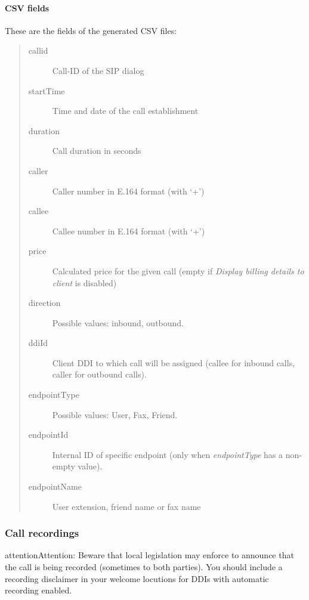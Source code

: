 \documentclass[letterpaper,10pt,english]{sphinxmanual}
\begin{document}
\paragraph{CSV fields}
\label{administration_portal/client/vpbx/calls/call_csv_schedulers:csv-fields}
These are the fields of the generated CSV files:
\begin{quote}
\begin{description}
\item[{callid}] \leavevmode
Call-ID of the SIP dialog

\item[{startTime}] \leavevmode
Time and date of the call establishment

\item[{duration}] \leavevmode
Call duration in seconds

\item[{caller}] \leavevmode
Caller number in E.164 format (with `+')

\item[{callee}] \leavevmode
Callee number in E.164 format (with `+')

\item[{price}] \leavevmode
Calculated price for the given call (empty if \emph{Display billing details to client} is disabled)

\item[{direction}] \leavevmode
Possible values: inbound, outbound.

\item[{ddiId}] \leavevmode
Client DDI to which call will be assigned (callee for inbound calls, caller for outbound calls).

\item[{endpointType}] \leavevmode
Possible values: User, Fax, Friend.

\item[{endpointId}] \leavevmode
Internal ID of specific endpoint (only when \emph{endpointType} has a non-empty value).

\item[{endpointName}] \leavevmode
User extension, friend name or fax name

\end{description}
\end{quote}


\subsubsection{Call recordings}
\label{administration_portal/client/vpbx/calls/call_recordings::doc}\label{administration_portal/client/vpbx/calls/call_recordings:call-recordings}\label{administration_portal/client/vpbx/calls/call_recordings:id1}
\begin{notice}{attention}{Attention:}
Beware that local legislation may enforce to announce that the
call is being recorded (sometimes to both parties). You should include
a recording disclaimer in your welcome locutions for DDIs with automatic
recording enabled.
\end{notice}
\end{document}
